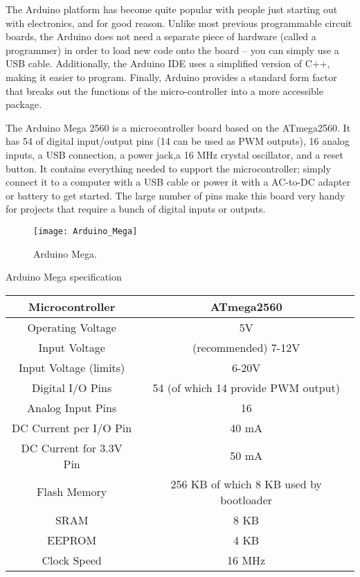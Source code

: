 The Arduino platform has become quite popular with people just starting out with electronics, and for good reason. Unlike most previous programmable circuit boards, the Arduino does not need a separate piece of hardware (called a programmer) in order to load new code onto the board – you can simply use a USB cable. Additionally, the Arduino IDE uses a simplified version of C++, making it easier to program. 
Finally, Arduino provides a standard form factor that breaks out the functions of the micro-controller into a more accessible package.

The Arduino Mega 2560 is a microcontroller board based on the ATmega2560. It has 54 of digital input/output pins (14 can be used as PWM outputs), 16 analog inputs, a USB connection, a power jack,a 16 MHz crystal oscillator, and a reset button. It contains everything needed to support the microcontroller; simply connect it to a computer with a USB cable or power it with a AC-to-DC adapter or battery to get started. The large number of pins make this board very handy for projects that require a bunch of digital inputs or outputs.


\begin{figure}[h]		
	\centering
	\texttt{[image: Arduino\_Mega]}
	\caption{Arduino Mega.}
	\label{Fig:Mega}
\end{figure}
	 Arduino Mega specification
\begin{center}
	\begin{tabular}{ |c|c|}
		\hline
		Microcontroller			& ATmega2560 \\ \hline
		Operating Voltage		& 5V\\ \hline
		Input Voltage			& (recommended) 7-12V\\ \hline
		Input Voltage (limits) 	& 6-20V\\ \hline
		Digital I/O Pins 		& 54 (of which 14 provide PWM output)\\ \hline
		Analog Input Pins 		& 16\\ \hline
		DC Current per I/O Pin	& 40 mA\\ \hline
		DC Current for 3.3V Pin & 50 mA\\ \hline
		Flash Memory			& 256 KB of which 8 KB used by bootloader\\ \hline
		SRAM					& 8 KB\\ \hline
		EEPROM 					& 4 KB\\ \hline
		Clock Speed 			& 16 MHz\\ \hline
	\end{tabular}
\end{center}

